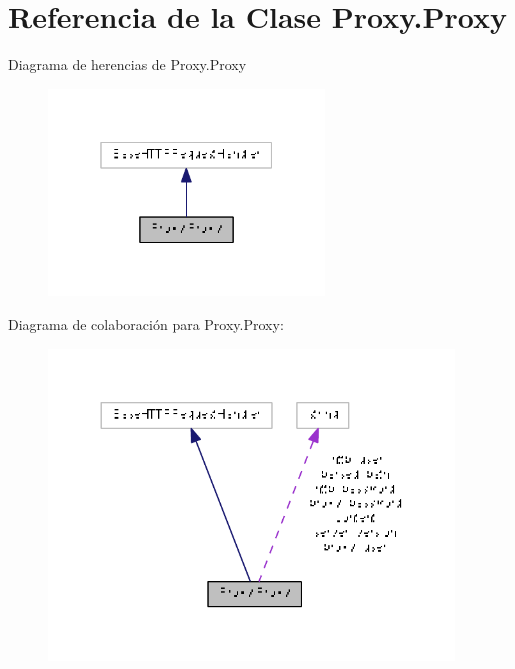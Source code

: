 \hypertarget{class_proxy_1_1_proxy}{\section{Referencia de la Clase Proxy.\-Proxy}
\label{class_proxy_1_1_proxy}
}


Diagrama de herencias de Proxy.\-Proxy\nopagebreak
\begin{figure}[H]
\begin{center}
\leavevmode
\includegraphics[width=208pt]{class_proxy_1_1_proxy__inherit__graph}
\end{center}
\end{figure}


Diagrama de colaboración para Proxy.\-Proxy\-:\nopagebreak
\begin{figure}[H]
\begin{center}
\leavevmode
\includegraphics[width=305pt]{class_proxy_1_1_proxy__coll__graph}
\end{center}
\end{figure}
